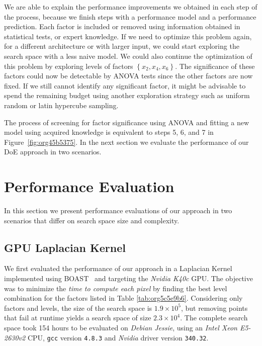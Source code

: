 \documentclass[conference]{IEEEtran}
\begin{document}
We are able to explain the performance  improvements we obtained in each step of
the process, because we finish steps  with a performance model and a performance
prediction. Each  factor is  included or removed  using information  obtained in
statistical tests,  or expert  knowledge. If  we need  to optimize  this problem
again,  for a  different  architecture  or with  larger  input,  we could  start
exploring the search space  with a less naive model. We  could also continue the
optimization    of   this    problem    by   exploring    levels   of    factors
\(\left\{x_2,x_4,x_6\right\}\).   The  significance of  these  factors  could now  be
detectable by  ANOVA tests since  the other factors are  now fixed. If  we still
cannot  identify any  significant factor,  it might  be advisable  to spend  the
remaining budget  using another exploration  strategy such as uniform  random or
latin hypercube sampling.

The process of  screening for factor significance using ANOVA  and fitting a new
model  using  acquired  knowledge  is  equivalent  to  steps  5,  6,  and  7  in
Figure~\ref{fig:org45b5375}. In  the next section we  evaluate the performance
of our DoE approach in two scenarios.
\section{Performance Evaluation}
\label{sec:orgeace0ee}
In  this section  we  present performance  evaluations of  our  approach in  two
scenarios that differ on search space size and complexity.
\vspace{-5pt}
\subsection{GPU Laplacian Kernel}
\label{sec:org40a0a1b}
We  first evaluated  the  performance  of our  approach  in  a Laplacian  Kernel
implemented  using BOAST~\cite{videau2017boast}  and targeting  the \emph{Nvidia  K40c}
GPU. The objective was to minimize the \emph{time to compute each pixel} by finding the
best    level     combination    for    the    factors     listed    in    Table
\ref{tab:org5c5e9b6}. Considering only factors and  levels, the size of the
search space  is \(1.9\times10^5\), but  removing points that  fail at runtime  yields a
search space of size  \(2.3\times10^4\). The complete search space took  154 hours to be
evaluated  on \emph{Debian  Jessie}, using  an \emph{Intel  Xeon E5-2630v2}  CPU, \texttt{gcc}
version \texttt{4.8.3} and \emph{Nvidia} driver version \texttt{340.32}.
\end{document}
